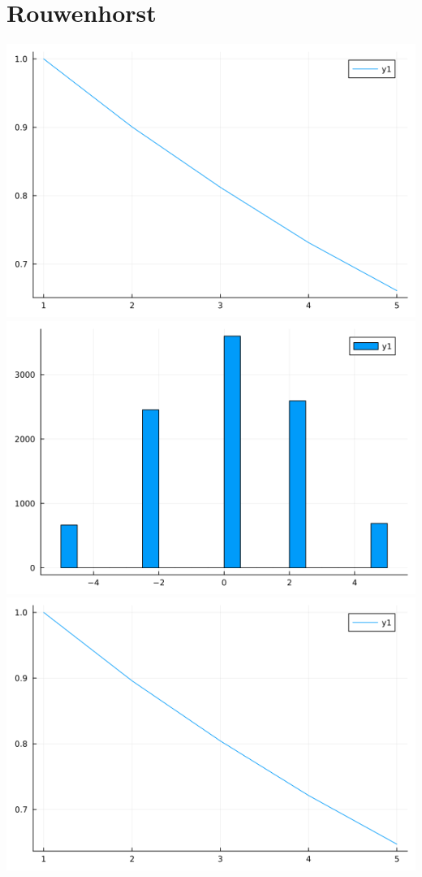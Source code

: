 \documentclass{article}
\begin{document}
\section*{Rouwenhorst}
\begin{center}
    \includegraphics[scale = 0.6]{p4.png} \\
    \includegraphics[scale = 0.6]{p9.png} \\
    \includegraphics[scale = 0.6]{p5.png} \\

\end{center}
\end{document}
